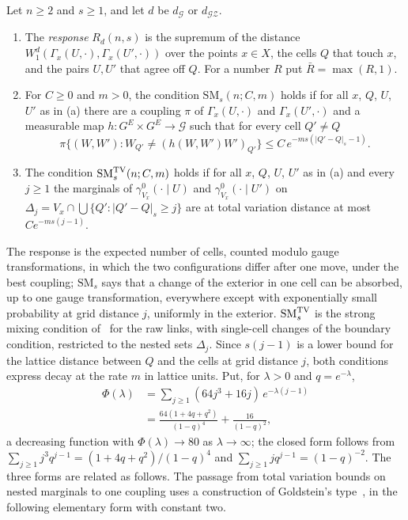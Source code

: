\begin{definition}\label{rW9:def}
Let $n\ge2$ and $s\ge1$, and let $d$ be $d_{\mathcal G}$ or $d_{\mathcal{GZ}}$.
\begin{enumerate}[label=\textup{(\alph*)},leftmargin=*]
\item The \emph{response} $R_d(n,s)$ is the supremum of the distance
$W_1^d(\Gamma_x(U,\cdot),\Gamma_x(U',\cdot))$ over the points $x\in X$, the
cells $Q$ that touch $x$, and the pairs $U,U'$ that agree off $Q$. For a
number $R$ put $\bar R=\max(R,1)$.
\item For $C\ge0$ and $m>0$, the condition $\mathrm{SM}_s(n;C,m)$ holds if for
all $x$, $Q$, $U$, $U'$ as in (a) there are a coupling $\pi$ of
$\Gamma_x(U,\cdot)$ and $\Gamma_x(U',\cdot)$ and a measurable map $h:G^E
\times G^E\to\mathcal G$ such that for every cell $Q'\ne Q$
\[
\pi\bigl\{(W,W'):W_{Q'}\ne(h(W,W')W')_{Q'}\bigr\}\le C\,e^{-ms(\lvert Q'-Q
\rvert_s-1)} .
\]
\item The condition $\mathrm{SM}^{\rm TV}_s(n;C,m)$ holds if for all $x$,
$Q$, $U$, $U'$ as in (a) and every $j\ge1$ the marginals of $\gamma^0_{V_x}
(\cdot\mid U)$ and $\gamma^0_{V_x}(\cdot\mid U')$ on $\Delta_j=V_x\cap
\bigcup\{Q':\lvert Q'-Q\rvert_s\ge j\}$ are at total variation distance at
most $C e^{-ms(j-1)}$.
\end{enumerate}
\end{definition}

The response is the expected number of cells, counted modulo gauge
transformations, in which the two configurations differ after one move,
under the best coupling; $\mathrm{SM}_s$ says that a change of the exterior
in one cell can be absorbed, up to one gauge transformation, everywhere
except with exponentially small probability at grid distance $j$, uniformly in
the exterior. $\mathrm{SM}^{\rm TV}_s$ is the strong mixing condition
of~\cite{MO94a,Mar99} for the raw links, with single-cell changes of the
boundary condition, restricted to the nested sets $\Delta_j$. Since $s(j-1)$
is a lower bound for the lattice distance between $Q$ and the cells at grid
distance $j$, both conditions express decay at the rate $m$ in lattice
units. Put, for $\lambda>0$ and $q=e^{-\lambda}$,
\[
\begin{split}
\Phi(\lambda)&=\sum_{j\ge1}(64j^3+16j)\,e^{-\lambda(j-1)}\\
&=\frac{64(1+4q+q^2)}{(1-q)^4}+\frac{16}{(1-q)^2},
\end{split}
\]
a decreasing function with $\Phi(\lambda)\to80$ as $\lambda\to\infty$; the
closed form follows from $\sum_{j\ge1}j^3q^{j-1}=(1+4q+q^2)/(1-q)^4$ and
$\sum_{j\ge1}jq^{j-1}=(1-q)^{-2}$.
The three forms are related as follows. The passage from total variation
bounds on nested marginals to one coupling uses a construction of
Goldstein's type~\cite{Gol79}, in the following elementary form with
constant two.

